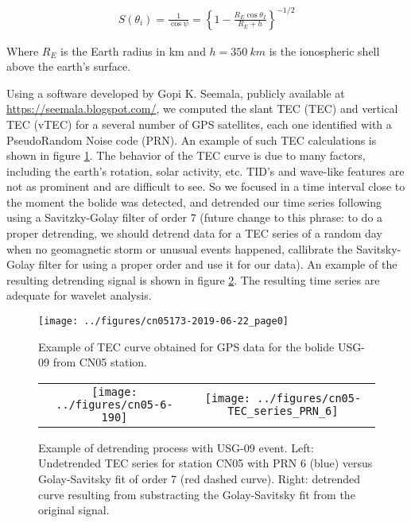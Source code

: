   \begin{align}
    S(\theta_i) = \frac{1}{\cos\psi} = \left\lbrace 1-\frac{R_E\cos\theta_I}{R_E+h}\right\rbrace^{-1/2}
  \end{align}

  Where $R_E$ is the Earth radius in km and $h=\SI{350}{km}$ is the ionospheric shell above the earth's surface.

 Using a software developed by Gopi K. Seemala, publicly available at \url{https://seemala.blogspot.com/}, we computed the slant TEC (TEC) and vertical TEC (vTEC) for a several number of GPS satellites, each one identified with a PseudoRandom Noise code (PRN). An example of such TEC calculations is shown in figure \ref{fig:TEC-curve-example}. The behavior of the TEC curve is due to many factors, including the earth's rotation, solar activity, etc. TID's and wave-like features are not as prominent and are difficult to see. So we focused in a time interval close to the moment the bolide was detected, and detrended our time series following \citet{Pradipta:2015} using a Savitzky-Golay filter of order 7 (future change to this phrase: to do a proper detrending, we should detrend data for a TEC series of a random day when no geomagnetic storm or unusual events happened, callibrate the Savitsky-Golay filter for using a proper order and use it for our data). An example of the resulting detrending signal is shown in figure \ref{fig:detrending-example}. The resulting time series are adequate for wavelet analysis.%

\begin{figure}
\texttt{[image: ../figures/cn05173-2019-06-22\_page0]}
\label{fig:TEC-curve-example}
\caption{Example of TEC curve obtained for GPS data for the bolide USG-09 from CN05 station.}
\end{figure}
 

\begin{figure}
\begin{tabular}{cc}
\texttt{[image: ../figures/cn05-6-190]}&
\texttt{[image: ../figures/cn05-TEC\_series\_PRN\_6]}
\end{tabular}
\label{fig:detrending-example}
\caption{Example of detrending process with USG-09 event. Left: Undetrended TEC series for station CN05 with PRN 6 (blue) versus Golay-Savitsky fit of order 7 (red dashed curve). Right: detrended curve resulting from substracting the Golay-Savitsky fit from the original signal.}
\end{figure}
  
